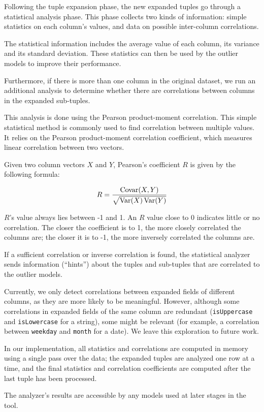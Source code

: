 Following the tuple expansion phase, the new expanded tuples go through a statistical analysis phase. This phase collects two kinds of information: simple statistics on each column's values, and data on possible inter-column correlations.

The statistical information includes the average value of each column, its variance and its standard deviation. These statistics can then be used by the outlier models to improve their performance.

Furthermore, if there is more than one column in the original dataset, we run an additional analysis to determine whether there are correlations between columns in the expanded sub-tuples.

This analysis is done using the Pearson product-moment correlation. This simple statistical method is commonly used to find correlation between multiple values. It relies on the Pearson product-moment correlation coefficient, which measures linear correlation between two vectors.

Given two column vectors $X$ and $Y$, Pearson's coefficient $R$ is given by the following formula:

\begin{equation} 
\label{eqn:pearson}
R = \frac{\operatorname{Covar}(X,Y)}{\sqrt{\operatorname{Var}(X)\operatorname{Var}(Y)}}
\end{equation}

$R$'s value always lies between -1 and 1. An $R$ value close to 0 indicates little or no correlation. The closer the coefficient is to 1, the more closely correlated the columns are; the closer it is to -1, the more inversely correlated the columns are.

If a sufficient correlation or inverse correlation is found, the statistical analyzer sends information (``hints'') about the tuples and sub-tuples that are correlated to the outlier models.

Currently, we only detect correlations between expanded fields of different columns, as they are more likely to be meaningful. However, although some correlations in expanded fields of the same column are redundant (\texttt{isUppercase} and \texttt{isLowercase} for a string), some might be relevant (for example, a correlation between \texttt{weekday} and \texttt{month} for a date). We leave this exploration to future work.

In our implementation, all statistics and correlations are computed in memory using a single pass over the data; the expanded tuples are analyzed one row at a time, and the final statistics and correlation coefficients are computed after the last tuple has been processed.

The analyzer's results are accessible by any models used at later stages in the tool.
